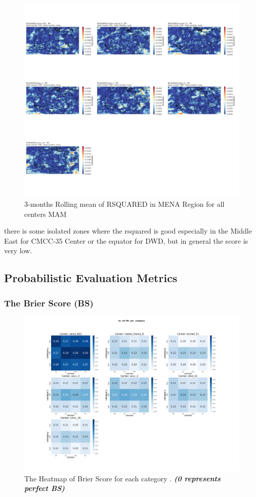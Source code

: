 \begin{figure}[H]
\includegraphics[scale=0.3]{plots/det/rsquared/rsquared_mam_RR.png}
\caption{3-months Rolling mean of RSQUARED in MENA Region for all centers MAM}
\end{figure}

there is some isolated zones where the rsquared is good especially in the Middle East for CMCC-35 Center or the equator for DWD, but in general the score is very low.


\subsection{Probabilistic Evaluation Metrics}

\subsubsection{The Brier Score (BS)}

\begin{figure}[H]
    \centering
    \includegraphics[scale=0.25]{plots/prob/bs/bs_RR_category.png}
    \caption{The Heatmap of Brier Score for each category  . \textbf{\textit{(0 represents perfect BS)}}}
\end{figure}

